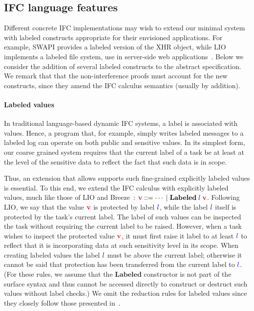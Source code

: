 \documentclass{sigplanconf}
\begin{document}
\subsection{IFC language features}
\label{sec:extensions:labeled}

Different concrete IFC implementations may wish to extend our minimal
system with labeled constructs appropriate for their envisioned
applications.
%
For example, SWAPI provides a labeled version of the XHR object, while
LIO implements a labeled file system, use in server-side web
applications~\cite{hails}.
%
Below we
consider the addition of several labeled constructs to the abstract specification.
%
We remark that that the non-interference proofs must account for the
new constructs, since they amend the IFC calculus semantics (usually
by addition).

\paragraph{Labeled values}
In traditional language-based dynamic IFC systems, a label is
associated with values.
%
Hence, a program that, for example, simply writes labeled messages to
a labeled log can operate on both public and sensitive values.
%
In its simplest form, our coarse grained system requires that the
current label of a task be at least at the level of the sensitive data
to reflect the fact that such data is in scope.
 
Thus, an extension that allows supports such fine-grained explicitly
labeled values is essential.
%
To this end, we extend the IFC calculus with explicitly labeled
values, much like those of LIO and
Breeze~\cite{lio, Hritcu:2013:YIB:2497621.2498098}: \ensuremath{\tar{v}\Coloneqq\cdots\;|\;\textbf{Labeled}\;\ifc{l}\;\tar{v}}.
%
Following LIO, we say that the value \ensuremath{\tar{v}} is protected by label \ensuremath{\ifc{l}},
while the label \ensuremath{\ifc{l}} itself is protected by the task's current label.
%
%
The label of such values can be inspected the task without
requiring the current label to be raised.
%
However, when a task wishes to inspect the protected value \ensuremath{\tar{v}}, it
must first raise it label to at least \ensuremath{\ifc{l}} to reflect that it is
incorporating data at such sensitivity level in its scope.
%
When creating labeled values the label \ensuremath{\ifc{l}} must be above
the current label; otherwise it cannot be said that protection has
been transferred from the current label to \ensuremath{\ifc{l}}.
%
(For these rules, we assume that the \ensuremath{\textbf{Labeled}} constructor is not part of
the surface syntax and thus cannot be accessed directly to construct
or destruct such values without label checks.)
% 
We omit the reduction rules for labeled values since they closely
follow those presented in~\cite{lio}.
\end{document}

